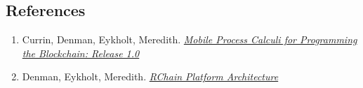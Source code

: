 \documentclass[12pt]{article}
\numberwithin{equation}{section}
\begin{document}
\subsection{References}
\begin{enumerate}
\item Currin, Denman, Eykholt, Meredith. \href{https://media.readthedocs.org/pdf/mobile-process-calculi-for-programming-the-new-blockchain/latest/mobile-process-calculi-for-programming-the-new-blockchain.pdf}{\emph{Mobile Process Calculi for Programming the Blockchain: Release 1.0}}

\item Denman, Eykholt, Meredith. \href{https://rchain-architecture.readthedocs.io/en/latest/}{\emph{RChain Platform Architecture}}
\end{enumerate}

\end{document}
